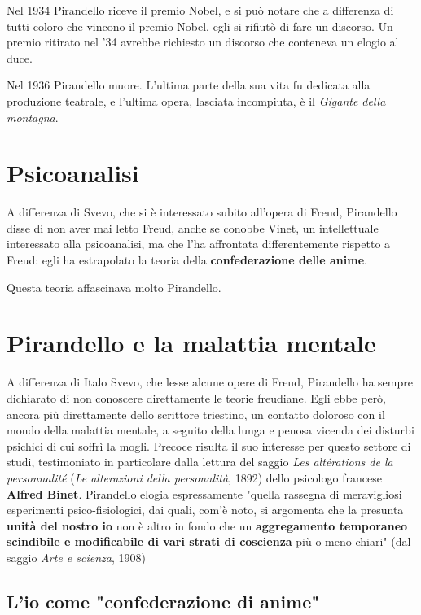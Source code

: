 Nel 1934 Pirandello riceve il premio Nobel, e si può notare che a differenza di tutti coloro che vincono il premio Nobel, egli si rifiutò di fare un discorso.
Un premio ritirato nel '34 avrebbe richiesto un discorso che conteneva un elogio al duce.

Nel 1936 Pirandello muore. L'ultima parte della sua vita fu dedicata alla produzione teatrale, e l'ultima opera, lasciata incompiuta, è il \textit{Gigante della montagna}.

\section{Psicoanalisi}

A differenza di Svevo, che si è interessato subito all'opera di Freud, Pirandello disse di non aver mai letto Freud, anche se conobbe Vinet, un intellettuale interessato alla psicoanalisi, ma che l'ha affrontata differentemente rispetto a Freud: egli ha estrapolato la teoria della \textbf{confederazione delle anime}.

Questa teoria affascinava molto Pirandello.

\section{Pirandello e la malattia mentale}

A differenza di Italo Svevo, che lesse alcune opere di Freud, Pirandello ha sempre dichiarato di non conoscere direttamente le teorie freudiane. Egli ebbe però, ancora più direttamente dello scrittore triestino, un contatto doloroso con il mondo della malattia mentale, a seguito della lunga e penosa vicenda dei disturbi psichici di cui soffrì la mogli. Precoce risulta il suo interesse per questo settore di studi, testimoniato in particolare dalla lettura del saggio \textit{Les altérations de la personnalité} (\textit{Le alterazioni della personalità}, 1892) dello psicologo francese \textbf{Alfred Binet}. Pirandello elogia espressamente "quella rassegna di meravigliosi esperimenti psico-fisiologici, dai quali, com'è noto, si argomenta che la presunta \textbf{unità del nostro io} non è altro in fondo che un \textbf{aggregamento temporaneo scindibile e modificabile di vari strati di coscienza} più o meno chiari" (dal saggio \textit{Arte e scienza}, 1908)

\subsection{L'io come "confederazione di anime"}

